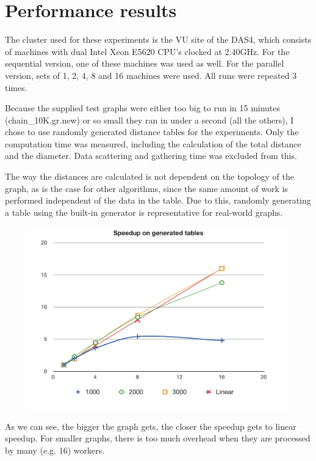 \documentclass[11pt,a4paper]{article}
\begin{document}
\section{Performance results}
The cluster used for these experiments is the VU site of the DAS4, which consists of machines with dual Intel Xeon E5620 CPU's clocked at 2.40GHz. For the sequential version, one of these machines was used as well. For the parallel version, sets of 1, 2, 4, 8 and 16 machines were used. All runs were repeated 3 times.

Because the supplied test graphs were either too big to run in 15 minutes (chain\_10K.gr.new) or so small they ran in under a second (all the others), I chose to use randomly generated distance tables for the experiments. Only the computation time was measured, including the calculation of the total distance and the diameter. Data scattering and gathering time was excluded from this.

The way the distances are calculated is not dependent on the topology of the graph, as is the case for other algorithms, since the same amount of work is performed independent of the data in the table. Due to this, randomly generating a table using the built-in generator is representative for real-world graphs.

\begin{figure}[h]
\includegraphics[scale=0.7]{figures/speedup.pdf}
\end{figure}

As we can see, the bigger the graph gets, the closer the speedup gets to linear speedup. For smaller graphs, there is too much overhead when they are processed by many (e.g. 16) workers.
\end{document}
